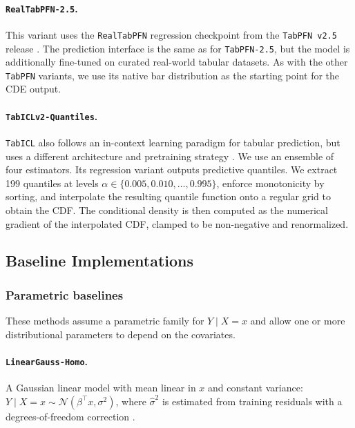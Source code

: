 \documentclass{article}
\newcommand{\method}[1]{\texttt{#1}}
\begin{document}
\paragraph{\method{RealTabPFN-2.5}.}
This variant uses the \method{RealTabPFN} regression checkpoint from the
\method{TabPFN~v2.5} release \citep{hollmann2025tabpfn}. The prediction
interface is the same as for \method{TabPFN-2.5}, but the model is additionally
fine-tuned on curated real-world tabular datasets. As with the other
\method{TabPFN} variants, we use its native bar distribution as the starting
point for the CDE output.

\paragraph{\method{TabICLv2-Quantiles}.}
\method{TabICL} also follows an in-context learning paradigm for tabular
prediction, but uses a different architecture and pretraining strategy
\citep{qu2025tabicl,qu2026tabiclv2}. We use an ensemble of four estimators. Its
regression variant outputs predictive quantiles. We extract 199 quantiles at
levels $\alpha \in \{0.005, 0.010, \ldots, 0.995\}$, enforce monotonicity by
sorting, and interpolate the resulting quantile function onto a regular grid to
obtain the CDF. The conditional density is then computed as the numerical
gradient of the interpolated CDF, clamped to be non-negative and renormalized.

\subsection{Baseline Implementations}
\label{app:baseline_details}

\subsubsection{Parametric baselines}
\label{app:parametric_details}

These methods assume a parametric family for $Y\mid X=x$ and allow one or more
distributional parameters to depend on the covariates.

\paragraph{\method{LinearGauss-Homo}.}
A Gaussian linear model with mean linear in $x$ and constant variance:
$Y\mid X=x\sim\mathcal N(\beta^\top x,\sigma^2)$, where $\hat\sigma^2$ is
estimated from training residuals with a degrees-of-freedom correction
\citep{rigby2005generalized,kneib2023rage}.
\end{document}

